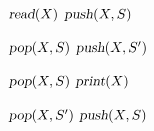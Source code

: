 
\begin{algorithm}[H]
  \begin{algorithmic}[1]
	\State $\textsl{read}(X)$
	\State $\textsl{push}(X, S)$
      \EndFor

      \hStatex
	  \State $\textsl{pop}(X, S)$
	  \State $\textsl{push}(X, S')$
	\EndWhile
        
	\hStatex
	\State $\textsl{pop}(X, S)$
	\State $\textsl{print}(X)$

	\hStatex
	  \State $\textsl{pop}(X, S')$
	  \State $\textsl{push}(X, S)$
	\EndWhile
      \EndFor
    \EndProcedure
  \end{algorithmic}
\end{algorithm}

